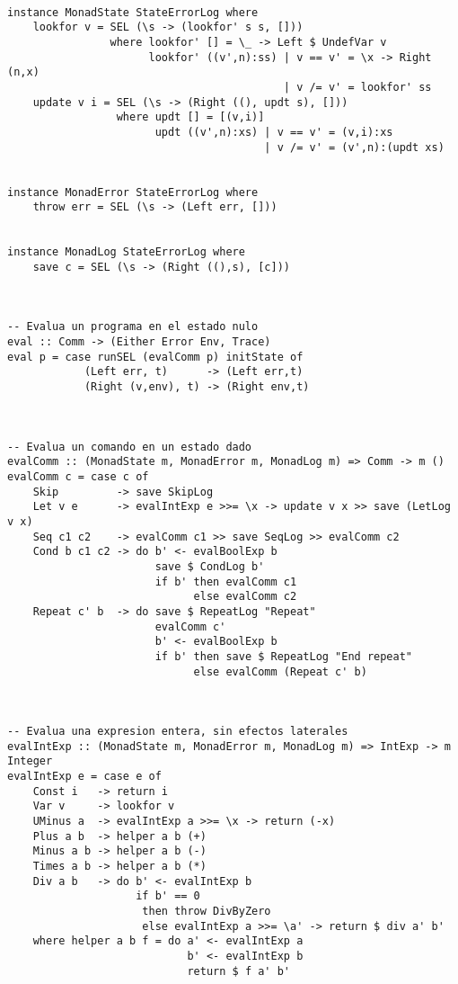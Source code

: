 \documentclass[a4paper]{report}
\begin{document}
\pagebreak
\begin{lstlisting}

instance MonadState StateErrorLog where
    lookfor v = SEL (\s -> (lookfor' s s, []))
                where lookfor' [] = \_ -> Left $ UndefVar v
                      lookfor' ((v',n):ss) | v == v' = \x -> Right (n,x)
                                           | v /= v' = lookfor' ss
    update v i = SEL (\s -> (Right ((), updt s), []))
                 where updt [] = [(v,i)]
                       updt ((v',n):xs) | v == v' = (v,i):xs
                                        | v /= v' = (v',n):(updt xs)


instance MonadError StateErrorLog where
    throw err = SEL (\s -> (Left err, []))


instance MonadLog StateErrorLog where
    save c = SEL (\s -> (Right ((),s), [c]))



-- Evalua un programa en el estado nulo
eval :: Comm -> (Either Error Env, Trace)
eval p = case runSEL (evalComm p) initState of
            (Left err, t)      -> (Left err,t)
            (Right (v,env), t) -> (Right env,t)



-- Evalua un comando en un estado dado
evalComm :: (MonadState m, MonadError m, MonadLog m) => Comm -> m ()
evalComm c = case c of
    Skip         -> save SkipLog
    Let v e      -> evalIntExp e >>= \x -> update v x >> save (LetLog v x)
    Seq c1 c2    -> evalComm c1 >> save SeqLog >> evalComm c2
    Cond b c1 c2 -> do b' <- evalBoolExp b
                       save $ CondLog b'
                       if b' then evalComm c1
                             else evalComm c2
    Repeat c' b  -> do save $ RepeatLog "Repeat"
                       evalComm c'
                       b' <- evalBoolExp b
                       if b' then save $ RepeatLog "End repeat"
                             else evalComm (Repeat c' b)



-- Evalua una expresion entera, sin efectos laterales
evalIntExp :: (MonadState m, MonadError m, MonadLog m) => IntExp -> m Integer
evalIntExp e = case e of
    Const i   -> return i
    Var v     -> lookfor v
    UMinus a  -> evalIntExp a >>= \x -> return (-x)
    Plus a b  -> helper a b (+)
    Minus a b -> helper a b (-)
    Times a b -> helper a b (*)
    Div a b   -> do b' <- evalIntExp b
                    if b' == 0
                     then throw DivByZero
                     else evalIntExp a >>= \a' -> return $ div a' b'
    where helper a b f = do a' <- evalIntExp a
                            b' <- evalIntExp b
                            return $ f a' b'




\end{lstlisting}
\end{document}
